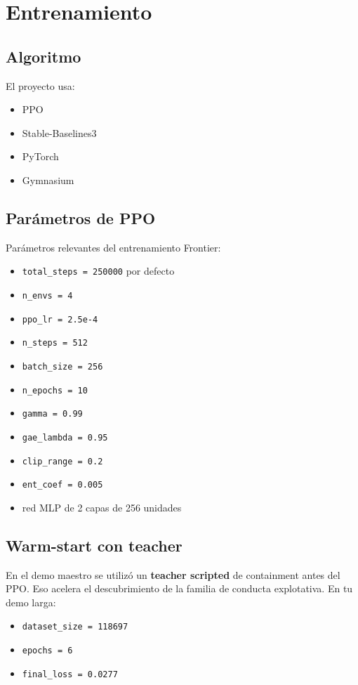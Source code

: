 \documentclass[11pt]{article}
\begin{document}
\section{Entrenamiento}
\subsection{Algoritmo}
El proyecto usa:
\begin{itemize}
    \item PPO
    \item Stable-Baselines3
    \item PyTorch
    \item Gymnasium
\end{itemize}

\subsection{Parámetros de PPO}
Parámetros relevantes del entrenamiento Frontier:
\begin{itemize}
    \item \texttt{total\_steps = 250000} por defecto
    \item \texttt{n\_envs = 4}
    \item \texttt{ppo\_lr = 2.5e-4}
    \item \texttt{n\_steps = 512}
    \item \texttt{batch\_size = 256}
    \item \texttt{n\_epochs = 10}
    \item \texttt{gamma = 0.99}
    \item \texttt{gae\_lambda = 0.95}
    \item \texttt{clip\_range = 0.2}
    \item \texttt{ent\_coef = 0.005}
    \item red MLP de 2 capas de 256 unidades
\end{itemize}

\subsection{Warm-start con teacher}
En el demo maestro se utilizó un \textbf{teacher scripted} de containment antes del PPO. Eso acelera el descubrimiento de la familia de conducta explotativa. En tu demo larga:
\begin{itemize}
    \item \texttt{dataset\_size = 118697}
    \item \texttt{epochs = 6}
    \item \texttt{final\_loss = 0.0277}
\end{itemize}
\end{document}
